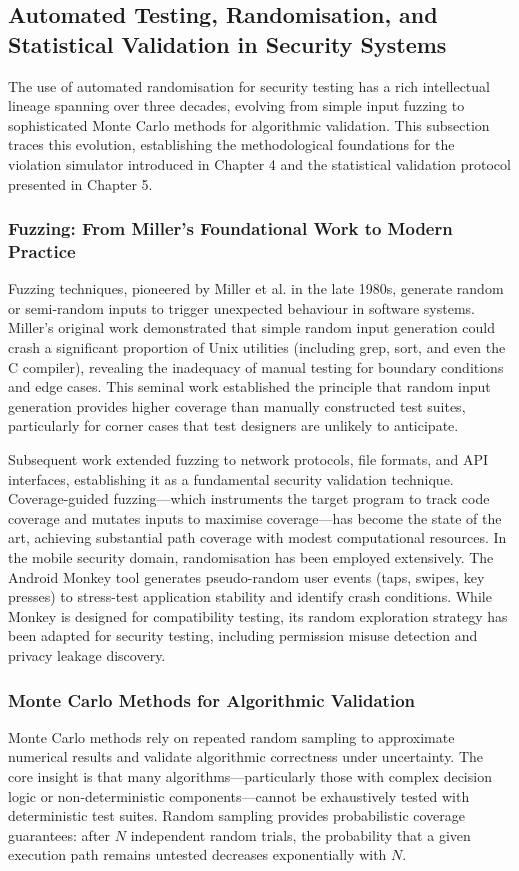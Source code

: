 \subsection{Automated Testing, Randomisation, and Statistical Validation in Security Systems}
The use of automated randomisation for security testing has a rich intellectual lineage spanning over three decades, evolving from simple input fuzzing to sophisticated Monte Carlo methods for algorithmic validation. This subsection traces this evolution, establishing the methodological foundations for the violation simulator introduced in Chapter 4 and the statistical validation protocol presented in Chapter 5.

\subsubsection{Fuzzing: From Miller's Foundational Work to Modern Practice}
Fuzzing techniques, pioneered by Miller et al. in the late 1980s, generate random or semi-random inputs to trigger unexpected behaviour in software systems. Miller's original work demonstrated that simple random input generation could crash a significant proportion of Unix utilities (including grep, sort, and even the C compiler), revealing the inadequacy of manual testing for boundary conditions and edge cases. This seminal work established the principle that random input generation provides higher coverage than manually constructed test suites, particularly for corner cases that test designers are unlikely to anticipate.

Subsequent work extended fuzzing to network protocols, file formats, and API interfaces, establishing it as a fundamental security validation technique. Coverage-guided fuzzing—which instruments the target program to track code coverage and mutates inputs to maximise coverage—has become the state of the art, achieving substantial path coverage with modest computational resources. In the mobile security domain, randomisation has been employed extensively. The Android Monkey tool generates pseudo-random user events (taps, swipes, key presses) to stress-test application stability and identify crash conditions. While Monkey is designed for compatibility testing, its random exploration strategy has been adapted for security testing, including permission misuse detection and privacy leakage discovery.

\subsubsection{Monte Carlo Methods for Algorithmic Validation}
Monte Carlo methods rely on repeated random sampling to approximate numerical results and validate algorithmic correctness under uncertainty. The core insight is that many algorithms—particularly those with complex decision logic or non-deterministic components—cannot be exhaustively tested with deterministic test suites. Random sampling provides probabilistic coverage guarantees: after \(N\) independent random trials, the probability that a given execution path remains untested decreases exponentially with \(N\).


